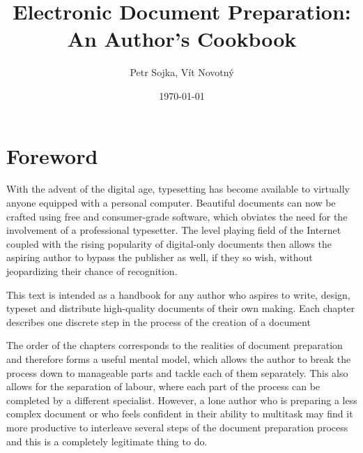 \documentclass[b5paper]{book}
\title{Electronic Document Preparation: An Author's Cookbook}
\author{Petr Sojka, Vít Novotný}
\date{\today}
\begin{document}
  \frontmatter
    \maketitle
    \tableofcontents
  \mainmatter
    \chapter{Foreword}
      With the advent of the digital age, typesetting has become available to
      virtually anyone equipped with a personal computer. Beautiful documents
      can now be crafted using free and consumer-grade software, which obviates
      the need for the involvement of a professional typesetter. The level
      playing field of the Internet coupled with the rising popularity of
      digital-only documents then allows the aspiring author to bypass the
      publisher as well, if they so wish, without jeopardizing their chance of
      recognition.
      
      This text is intended as a handbook for any author who aspires to write,
      design, typeset and distribute high-quality documents of their own making.
      Each chapter describes one discrete step in the process of the creation of
      a document %

      The order of the chapters corresponds to the realities of document
      preparation and therefore forms a useful mental model, which allows the
      author to break the process down to manageable parts and tackle each of
      them separately. This also allows for the separation of labour, where
      each part of the process can be completed by a different specialist.
      However, a lone author who is preparing a less complex document or who
      feels confident in their ability to multitask may find it more productive
      to interleave several steps of the document preparation process and this
      is a completely legitimate thing to do.
\end{document}
